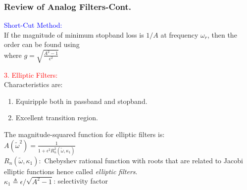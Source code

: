 \documentclass[mathserif, 10pt]{beamer} %
\begin{document}
\frame
{
\small
\frametitle{Review of Analog Filters-Cont.}

\textcolor{blue}{Short-Cut Method:} \\
If the magnitude of minimum stopband loss is $1/A$ at frequency $\omega_r$, then the order can be found using \vspace{.1in}
 \\ \vspace{.07in}
where $g=\sqrt{\frac{A^2-1}{\epsilon^2}}$ \vspace{.07in}

\textcolor{red}{3. Elliptic Filters:}\\
Characteristics are:
\begin{enumerate}
	\item Equiripple both in passband and stopband.
	\item Excellent transition region.
\end{enumerate}

The magnitude-squared function for elliptic filters is:\\ \vspace{.1in}
$A(\tilde{\omega}^2) = \frac{1}{1+\epsilon^2R_n^2(\tilde{\omega},\kappa_1)}$\\ \vspace{.1in}
$R_n(\tilde{\omega},\kappa_1): $  Chebyshev rational function with roots that are related to Jacobi elliptic functions hence called \textit{elliptic filters}.\\
$\kappa_1 \triangleq \epsilon/\sqrt{A^2-1}$: selectivity factor\\
}
\end{document}
